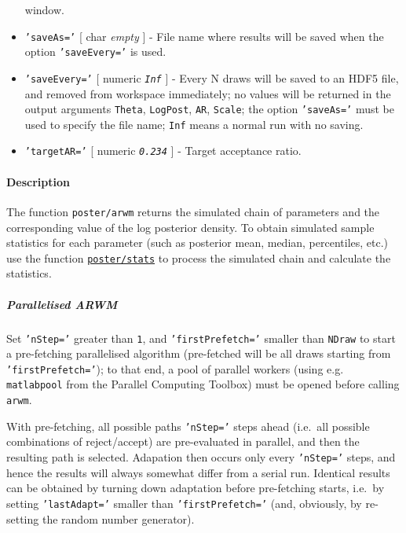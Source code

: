 \begin{itemize}
  window.
\item
  \texttt{'saveAs='} {[} char \textbar{} \emph{empty} {]} - File name
  where results will be saved when the option \texttt{'saveEvery='} is
  used.
\item
  \texttt{'saveEvery='} {[} numeric \textbar{} \emph{\texttt{Inf}} {]} -
  Every N draws will be saved to an HDF5 file, and removed from
  workspace immediately; no values will be returned in the output
  arguments \texttt{Theta}, \texttt{LogPost}, \texttt{AR},
  \texttt{Scale}; the option \texttt{'saveAs='} must be used to specify
  the file name; \texttt{Inf} means a normal run with no saving.
\item
  \texttt{'targetAR='} {[} numeric \textbar{} \emph{\texttt{0.234}} {]}
  - Target acceptance ratio.
\end{itemize}

\paragraph{Description}

The function \texttt{poster/arwm} returns the simulated chain of
parameters and the corresponding value of the log posterior density. To
obtain simulated sample statistics for each parameter (such as posterior
mean, median, percentiles, etc.) use the function
\href{poster/stats}{\texttt{poster/stats}} to process the simulated
chain and calculate the statistics.

\subparagraph{Parallelised ARWM}

Set \texttt{'nStep='} greater than \texttt{1}, and
\texttt{'firstPrefetch='} smaller than \texttt{NDraw} to start a
pre-fetching parallelised algorithm (pre-fetched will be all draws
starting from \texttt{'firstPrefetch='}); to that end, a pool of
parallel workers (using e.g. \texttt{matlabpool} from the Parallel
Computing Toolbox) must be opened before calling \texttt{arwm}.

With pre-fetching, all possible paths \texttt{'nStep='} steps ahead
(i.e.~all possible combinations of reject/accept) are pre-evaluated in
parallel, and then the resulting path is selected. Adapation then occurs
only every \texttt{'nStep='} steps, and hence the results will always
somewhat differ from a serial run. Identical results can be obtained by
turning down adaptation before pre-fetching starts, i.e.~by setting
\texttt{'lastAdapt='} smaller than \texttt{'firstPrefetch='} (and,
obviously, by re-setting the random number generator).

